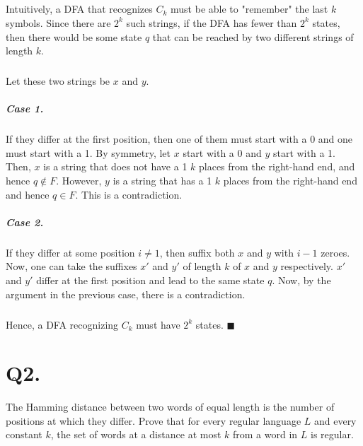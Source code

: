 \documentclass[]{article}
\begin{document}
	\subparagraph{}Intuitively, a DFA that recognizes $C_k$ must be able to "remember" the last $k$ symbols. Since there are $2^k$ such strings, if the DFA has fewer than $2^k$ states, then there would be some state $q$ that can be reached by two different strings of length $k$. \subparagraph{} Let these two strings be $x$ and $y$. \subparagraph{Case 1.} If they differ at the first position, then one of them must start with a 0 and one must start with a 1. By symmetry, let $x$ start with a 0 and $y$ start with a 1.  \\Then, $x$ is a string that does not have a 1 $k$ places from the right-hand end, and hence $q \not\in F$. However, $y$ is a string that has a 1 $k$ places from the right-hand end and hence $q \in F$. This is a contradiction. \subparagraph{Case 2.} If they differ at some position $i \neq 1$, then suffix both $x$ and $y$ with $i-1$ zeroes. Now, one can take the suffixes $x'$ and $y'$ of length $k$ of $x$ and $y$ respectively. $x'$ and $y'$ differ at the first position and lead to the same state $q$. Now, by the argument in the previous case, there is a contradiction. \subparagraph{} Hence, a DFA recognizing $C_k$ must have $2^k$ states. $ \blacksquare $
	\pagebreak
	\section*{Q2.}
	The Hamming distance between two words of equal length is the number of positions at which they differ. Prove that for every regular language $L$ and every constant $k$, the set of words at a distance at most $k$ from a word in $L$ is regular.
	
\end{document}
